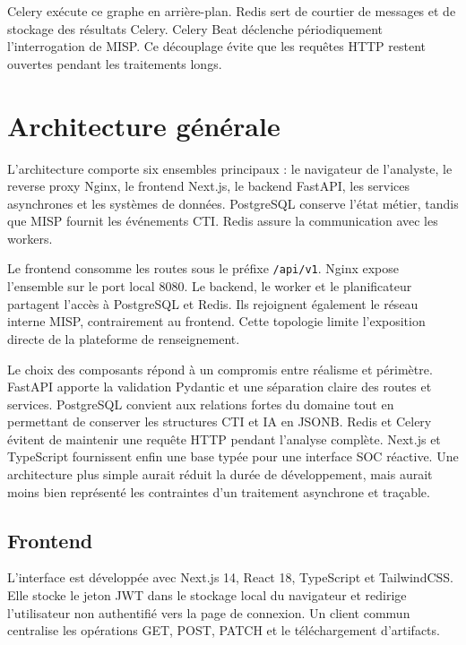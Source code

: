 Celery exécute ce graphe en arrière-plan. Redis sert de courtier de messages et de stockage des résultats Celery. Celery Beat déclenche périodiquement l'interrogation de MISP. Ce découplage évite que les requêtes HTTP restent ouvertes pendant les traitements longs.

\section{Architecture générale}

L'architecture comporte six ensembles principaux : le navigateur de l'analyste, le reverse proxy Nginx, le frontend Next.js, le backend FastAPI, les services asynchrones et les systèmes de données. PostgreSQL conserve l'état métier, tandis que MISP fournit les événements CTI. Redis assure la communication avec les workers.


Le frontend consomme les routes sous le préfixe \texttt{/api/v1}. Nginx expose l'ensemble sur le port local 8080. Le backend, le worker et le planificateur partagent l'accès à PostgreSQL et Redis. Ils rejoignent également le réseau interne MISP, contrairement au frontend. Cette topologie limite l'exposition directe de la plateforme de renseignement.

Le choix des composants répond à un compromis entre réalisme et périmètre. FastAPI apporte la validation Pydantic et une séparation claire des routes et services. PostgreSQL convient aux relations fortes du domaine tout en permettant de conserver les structures CTI et IA en JSONB. Redis et Celery évitent de maintenir une requête HTTP pendant l'analyse complète. Next.js et TypeScript fournissent enfin une base typée pour une interface SOC réactive. Une architecture plus simple aurait réduit la durée de développement, mais aurait moins bien représenté les contraintes d'un traitement asynchrone et traçable.

\subsection{Frontend}

L'interface est développée avec Next.js 14, React 18, TypeScript et TailwindCSS. Elle stocke le jeton JWT dans le stockage local du navigateur et redirige l'utilisateur non authentifié vers la page de connexion. Un client commun centralise les opérations GET, POST, PATCH et le téléchargement d'artifacts.


